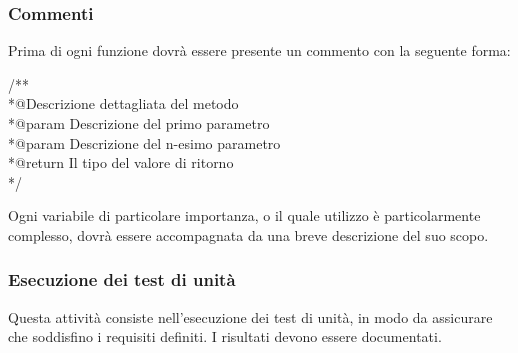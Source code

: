 \subsubsection{Commenti}

Prima di ogni funzione dovrà essere presente un commento con la seguente forma:

\begin{flushleft}
	/**\\
	 *@Descrizione dettagliata del metodo\\
	 *@param Descrizione del primo parametro\\
	 *@param Descrizione del n-esimo parametro\\
	 *@return Il tipo del valore di ritorno\\
	*/
\end{flushleft}

Ogni variabile di particolare importanza, o il quale utilizzo è particolarmente complesso, dovrà essere accompagnata da una breve descrizione del suo scopo.

\subsubsection{Esecuzione dei test di unità}
Questa attività consiste nell'esecuzione dei test di unità, in modo da assicurare che soddisfino i requisiti definiti. I risultati devono essere documentati.

